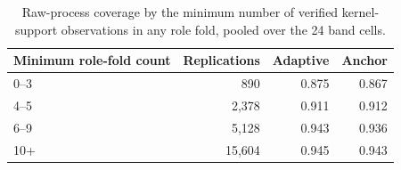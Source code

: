 \begin{table}[p]
\centering
\small
\caption{Raw-process coverage by the minimum number of verified kernel-support observations in any role fold, pooled over the 24 band cells.}
\label{tab:band-local-information}
\begin{tabular}{lrrr}
\toprule
Minimum role-fold count & Replications & Adaptive & Anchor \\
\midrule
0--3 & 890 & 0.875 & 0.867 \\
4--5 & 2,378 & 0.911 & 0.912 \\
6--9 & 5,128 & 0.943 & 0.936 \\
10+ & 15,604 & 0.945 & 0.943 \\
\bottomrule
\end{tabular}
\end{table}
